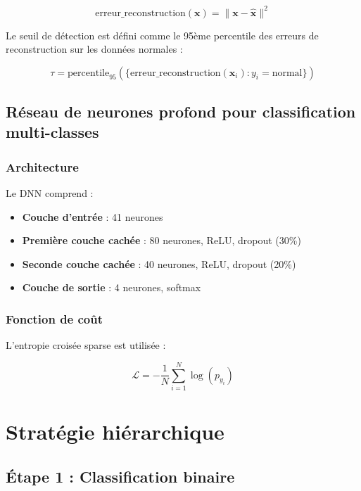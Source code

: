 \begin{equation}
    \text{erreur\_reconstruction}(\mathbf{x}) = \|\mathbf{x} - \mathbf{\hat{x}}\|^2
\end{equation}

Le seuil de détection est défini comme le 95ème percentile des erreurs de reconstruction sur les données normales :

\begin{equation}
    \tau = \text{percentile}_{95}(\{\text{erreur\_reconstruction}(\mathbf{x}_i) : y_i = \text{normal}\})
\end{equation}

\subsection{Réseau de neurones profond pour classification multi-classes}

\subsubsection{Architecture}
Le DNN comprend :
\begin{itemize}
    \item \textbf{Couche d'entrée} : 41 neurones
    \item \textbf{Première couche cachée} : 80 neurones, ReLU, dropout (30\%)
    \item \textbf{Seconde couche cachée} : 40 neurones, ReLU, dropout (20\%)
    \item \textbf{Couche de sortie} : 4 neurones, softmax
\end{itemize}

\subsubsection{Fonction de coût}
L'entropie croisée sparse est utilisée :

\begin{equation}
    \mathcal{L} = -\frac{1}{N}\sum_{i=1}^{N} \log(p_{y_i})
\end{equation}

\section{Stratégie hiérarchique}

\subsection{Étape 1 : Classification binaire}

